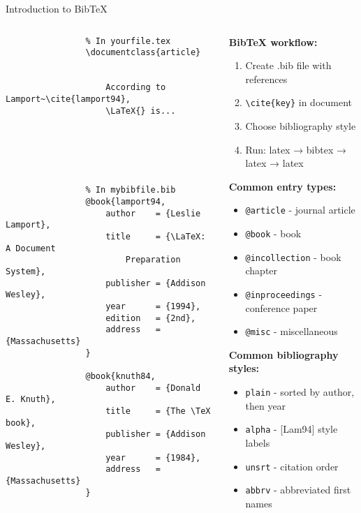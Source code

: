\begin{frame}[fragile]{Introduction to BibTeX}
	\begin{columns}
		\begin{column}{0.5\textwidth}
			\begin{lstlisting}
				% In yourfile.tex
				\documentclass{article}
				
					
					According to Lamport~\cite{lamport94},
					\LaTeX{} is...
					
					
					
					
				
			\end{lstlisting}
			
			\begin{lstlisting}
				% In mybibfile.bib
				@book{lamport94,
					author    = {Leslie Lamport},
					title     = {\LaTeX: A Document 
						Preparation System},
					publisher = {Addison Wesley},
					year      = {1994},
					edition   = {2nd},
					address   = {Massachusetts}
				}
				
				@book{knuth84,
					author    = {Donald E. Knuth},
					title     = {The \TeX book},
					publisher = {Addison Wesley},
					year      = {1984},
					address   = {Massachusetts}
				}
			\end{lstlisting}
		\end{column}
		
		\begin{column}{0.5\textwidth}
			\textbf{BibTeX workflow:}
			\begin{enumerate}
				\item Create .bib file with references
				\item \texttt{\textbackslash cite\{key\}} in document
				\item Choose bibliography style
				\item Run: latex → bibtex → latex → latex
			\end{enumerate}
			
			\textbf{Common entry types:}
			\begin{itemize}
				\item \texttt{@article} - journal article
				\item \texttt{@book} - book
				\item \texttt{@incollection} - book chapter
				\item \texttt{@inproceedings} - conference paper
				\item \texttt{@misc} - miscellaneous
			\end{itemize}
			
			\textbf{Common bibliography styles:}
			\begin{itemize}
				\item \texttt{plain} - sorted by author, then year
				\item \texttt{alpha} - [Lam94] style labels
				\item \texttt{unsrt} - citation order
				\item \texttt{abbrv} - abbreviated first names
			\end{itemize}
		\end{column}
	\end{columns}
\end{frame}

